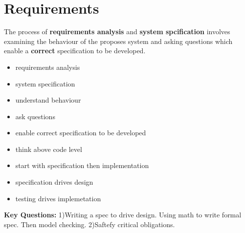 \documentclass{article}
\begin{document}
    \tableofcontents
    \newpage
    
    \section{Requirements}
    The process of \textbf{requirements analysis} and \textbf{system spcification}
    involves examining the behaviour of the proposes system and asking questions
    which enable a \textbf{correct} specification to be developed. 
    \begin{itemize}
        \item requirements analysis
        \item system specification 
        \item understand behaviour
        \item ask questions
        \item enable correct specification to be developed
        \item think above code level
        \item start with specification then implementation 
        \item specification drives design 
        \item testing drives implemetation 
    \end{itemize}

    \textbf{Key Questions:}
    1)Writing a spec to drive design. Using math to write formal spec. Then model checking.
    2)Saftefy critical obligations.\\
\end{document}
